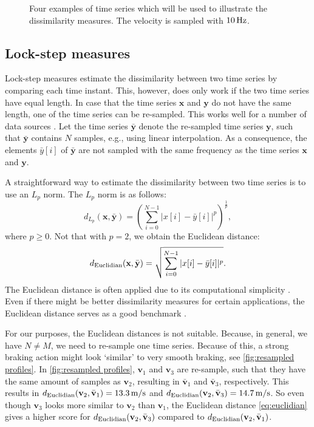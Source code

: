 \documentclass[10pt,final,a4paper,oneside,onecolumn]{article}
\newlength\figurewidth
\newlength\figureheight
\newcommand{\deuclid}{d_{\textup{Euclidian}}}
\newcommand{\profile}[1]{\textbf{v}_{#1}}
\newcommand{\barprofile}[1]{\bar{\textbf{v}}_{#1}}
\theoremstyle{plain}\newtheorem{definition}{Definition}[section]    %
\theoremstyle{definition}\newtheorem{example}{Example}[section]     %
\theoremstyle{remark}\newtheorem{remarkenv}{Remark}[section]        %
\begin{document}
\begin{figure}
	\centering
	\setlength{}
	\setlength{}
	
	\caption{Four examples of time series which will be used to illustrate the dissimilarity measures. The velocity is sampled with $\unit[10]{Hz}$.}
	\label{fig:example time series}
\end{figure}

\subsection{Lock-step measures}
\label{sec:lock step}

Lock-step measures estimate the dissimilarity between two time series by comparing each time instant. This, however, does only work if the two time series have equal length. In case that the time series $\textbf{x}$ and $\textbf{y}$ do not have the same length, one of the time series can be re-sampled. This works well for a number of data sources \cite{keogh2003survey}. Let the time series $\bar{\textbf{y}}$ denote the re-sampled time series $\textbf{y}$, such that $\bar{\textbf{y}}$ contains $N$ samples, e.g., using linear interpolation. As a consequence, the elements $\bar{y}[i]$ of $\bar{\textbf{y}}$ are not sampled with the same frequency as the time series $\textbf{x}$ and $\textbf{y}$. 

A straightforward way to estimate the dissimilarity between two time series is to use an $L_p$ norm. The $L_p$ norm is as follows:
\begin{equation} \label{eq:lp norm}
	d_{L_p}(\textbf{x}, \bar{\textbf{y}}) = \left( \sum_{i=0}^{N-1} |x[i] - \bar{y}[i]|^p \right)^{\frac{1}{p}},
\end{equation}
where $p \geq 0$. Not that with $p=2$, we obtain the Euclidean distance:
\begin{equation} \label{eq:euclidian}
	\deuclid(\textbf{x}, \bar{\textbf{y}}) = \sqrt{\sum_{i=0}^{N-1} |x[i] - \bar{y}[i]|^p}.
\end{equation}
The Euclidean distance is often applied due to its computational simplicity \cite{xing2010survey}. Even if there might be better dissimilarity measures for certain applications, the Euclidean distance serves as a good benchmark \cite{keogh2003survey}.

For our purposes, the Euclidean distances is not suitable. Because, in general, we have $N \ne M$, we need to re-sample one time series. Because of this, a strong braking action might look `similar' to very smooth braking, see \cref{fig:resampled profiles}. In \cref{fig:resampled profiles}, $\textbf{v}_1$ and $\textbf{v}_3$ are re-sample, such that they have the same amount of samples as $\profile{2}$, resulting in $\barprofile{1}$ and $\barprofile{3}$, respectively. This results in $\deuclid(\profile{2}, \barprofile{1})=\unit[13.3]{m/s}$ and $\deuclid(\profile{2}, \barprofile{3})=\unit[14.7]{m/s}$. So even though $\profile{3}$ looks more similar to $\profile{2}$ than $\profile{1}$, the Euclidean distance \cref{eq:euclidian} gives a higher score for $\deuclid(\profile{2}, \barprofile{3})$ compared to $\deuclid(\profile{2}, \barprofile{1})$.
\end{document}
